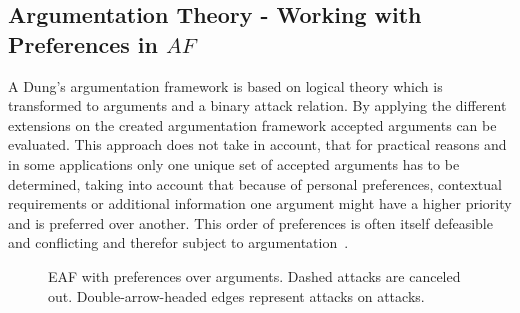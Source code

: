 \subsection{Argumentation Theory - Working with Preferences in $AF$}

A Dung's argumentation framework is based on logical theory which is transformed to arguments and a binary attack relation. By applying the different extensions on the created argumentation framework accepted arguments can be evaluated. This approach does not take in account, that for practical reasons and in some applications only one unique set of accepted arguments has to be determined, taking into account that because of personal preferences, contextual requirements or additional information one argument might have a higher priority and is preferred over another. This order of preferences is often itself defeasible and conflicting and therefor subject to argumentation \cite{Modgil2009}.


\begin{figure}[h]
\centering
{}
\caption{\gls{EAF} with preferences over arguments. Dashed attacks are canceled out. Double-arrow-headed edges represent attacks on attacks.}
\label{fig:eaf_intro}
\end{figure}


